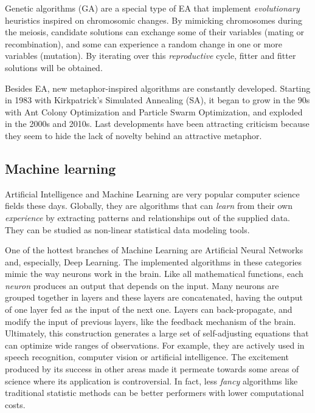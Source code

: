 Genetic algorithms (GA) are a special type of EA that implement \textit{evolutionary} heuristics inspired on chromosomic changes. By mimicking chromosomes during the meiosis, candidate solutions can exchange some of their variables (mating or recombination), and some can experience a random change in one or more variables (mutation). By iterating over this \textit{reproductive} cycle, fitter and fitter solutions will be obtained.

Besides EA, new metaphor-inspired algorithms are constantly developed. Starting in 1983 with Kirkpatrick's Simulated Annealing (SA),\cite{kirkpatrick1983optimization} it began to grow in the 90s with Ant Colony Optimization\cite{maniezzo1992distributed} and Particle Swarm Optimization,\cite{eberhart1995new} and exploded in the 2000s and 2010s. Last developments have been attracting criticism because they seem to hide the lack of novelty behind an attractive metaphor.\cite{S_rensen_2013,brownlee2015,swan2015research,Glover_2015}

\subsection{Machine learning}
Artificial Intelligence and Machine Learning are very popular computer science fields these days. Globally, they are algorithms that can \textit{learn} from their own \textit{experience} by extracting patterns and relationships out of the supplied data. They can be studied as non-linear statistical data modeling tools.

One of the hottest branches of Machine Learning are Artificial Neural Networks and, especially, Deep Learning. The implemented algorithms in these categories mimic the way neurons work in the brain. Like all mathematical functions, each \textit{neuron} produces an output that depends on the input. Many neurons are grouped together in layers and these layers are concatenated, having the output of one layer fed as the input of the next one. Layers can back-propagate, and modify the input of previous layers, like the feedback mechanism of the brain. Ultimately, this construction generates a large set of self-adjusting equations that can optimize wide ranges of observations. For example, they are actively used in speech recognition, computer vision or artificial intelligence. The excitement produced by its success in other areas made it permeate towards some areas of science where its application is controversial. In fact, less \textit{fancy} algorithms like traditional statistic methods can be better performers with lower computational costs.\cite{makridakis2018statistical}


